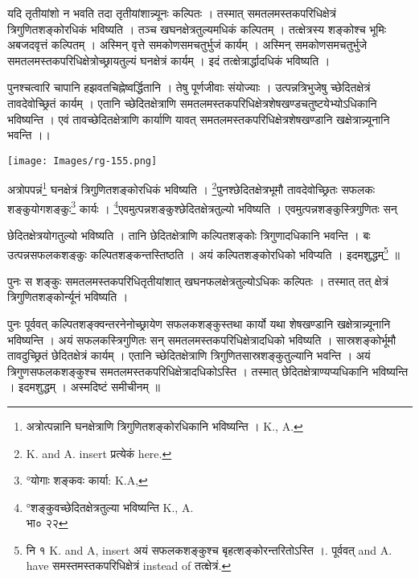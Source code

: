 \documentclass[11pt, openany]{book}
\begin{document}
 यदि तृतीयांशो न भवति तदा तृतीयांशान्न्यूनः कल्पितः । तस्मात् समतलमस्तकपरिधिक्षेत्रं त्रिगुणितशङ्कोरधिकं भविष्यति । तञ्च खघनक्षेत्रतुल्यमधिकं कल्पितम् । तत्क्षेत्रस्य शङ्कोश्च भूमिः
अबजदवृत्तं कल्पितम् । अस्मिन् वृत्ते समकोणसमचतुर्भुजं कार्यम् । अस्मिन् समकोणसमचतुर्भुजे समतलमस्तकपरिधिक्षेत्रोच्छ्रायतुल्यं घनक्षेत्रं कार्यम् । इदं तत्क्षेत्रार्द्धादधिकं भविष्यति । \\
\vspace{3mm}

पुनश्चत्वारि चापानि हझवतचिह्नेष्वर्द्धितानि । तेषु पूर्णजीवाः संयोज्याः । उत्पन्नत्रिभुजेषु च्छेदितक्षेत्रं तावदेवोच्छ्रितं कार्यम् । एतानि च्छेदितक्षेत्राणि समतलमस्तकपरिधिक्षेत्रशेषखण्डचतुष्टयेभ्योऽधिकानि भविष्यन्ति । एवं तावच्छेदितक्षेत्राणि कार्याणि यावत् समतलमस्तकपरिधिक्षेत्रशेषखण्डानि खक्षेत्रान्न्यूनानि भवन्ति ।। 
\begin{center}
\texttt{[image: Images/rg-155.png]}  
\end{center}

 अत्रोपपन्नं\renewcommand{\thefootnote}{१}\footnote{अत्रोत्पन्नानि घनक्षेत्राणि त्रिगुणितशङ्कोरधिकानि भविष्यन्ति । {\en K.,
 A.}} घनक्षेत्रं त्रिगुणितशङ्कोरधिकं भविष्यति । \renewcommand{\thefootnote}{२}\footnote{{\en K. and A. insert} प्रत्येकं {\en here.}}पुनश्छेदितक्षेत्रभूमौ तावदेवोच्छ्रितः सफलकः शङ्कुयोगशङ्कुः\renewcommand{\thefootnote}{३}\footnote{°योगाः शङ्कवः कार्या: {\en K.A,}} कार्यः । \renewcommand{\thefootnote}{४}\footnote{°शङ्कुवच्छेदितक्षेत्रतुल्या भविष्यन्ति {\en K., A.}\\
  भा० २२}एवमुत्पन्नशङ्कुश्छेदितक्षेत्रतुल्यो भविष्यति । एवमुत्पन्नशङ्कुस्त्रिगुणितः सन् 

\newpage
\noindent छेदितक्षेत्रयोगतुल्यो भविष्यति । तानि छेदितक्षेत्राणि कल्पितशङ्कोः त्रिगुणादधिकानि भवन्ति । बः उत्पन्नसफलकशङ्कुः कल्पितशङ्कन्तस्तिष्ठति । अयं कल्पितशङ्कोरधिको भविप्यति । इदमशुद्धम्\renewcommand{\thefootnote}{१}\footnote{नि १ {\en K. and A, insert} अयं सफलकशङ्कुश्च बृहत्शङ्कोरन्तरितोऽस्ति ।.
पूर्ववत् {\en and A. have} समस्तमस्तकपरिधिक्षेत्रं {\en instead of} तत्क्षेत्रं.
} ॥ \\
\vspace{3mm}

 पुनः स शङ्कुः समतलमस्तकपरिधितृतीयांशात् खघनफलक्षेत्रतुल्योऽधिकः कल्पितः । तस्मात् तत् क्षेत्रं त्रिगुणितशङ्कोर्न्यूनं भविष्यति । \\
\vspace{3mm}

पुनः पूर्ववत् कल्पितशङ्क्वन्तरनेनोच्छ्रायेण सफलकशङ्कुस्तथा कार्यो यथा शेषखण्डानि खक्षेत्रान्न्यूनानि भविष्यन्ति । अयं सफलकस्त्रिगुणितः सन् समतलमस्तकपरिधिक्षेत्रादधिको भविष्यति । सास्रशङ्कोर्भूमौ तावदुच्छ्रितं छेदितक्षेत्रं कार्यम् । एतानि च्छेदितक्षेत्राणि त्रिगुणितसास्रशङ्कुतुल्यानि भवन्ति । अयं त्रिगुणसफलकशङ्कुश्च समतलमस्तकपरिधिक्षेत्रादधिकोऽस्ति । तस्मात् छेदितक्षेत्राण्यप्यधिकानि भविष्यन्ति । इदमशुद्धम् । अस्मदिष्टं समीचीनम् ॥ \\
\vspace{3mm}
\end{document}
